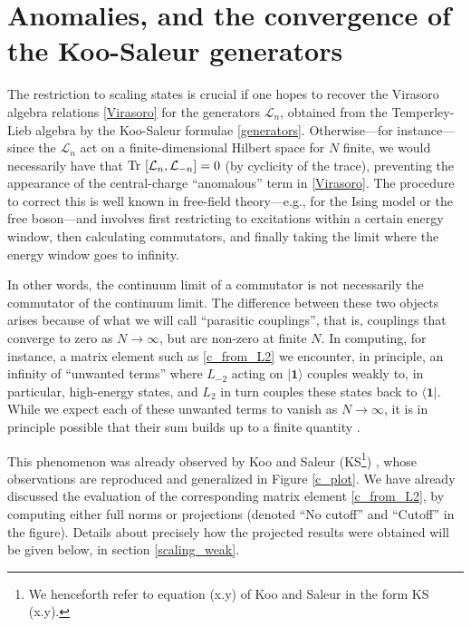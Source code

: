 \documentclass[a4paper,10pt]{article}
\begin{document}
\FloatBarrier


\section{Anomalies, and the convergence of the Koo-Saleur generators}\label{Anomalies}

The restriction to scaling states is crucial if one hopes to recover the Virasoro algebra relations \eqref{Virasoro} for the generators ${\mathcal L}_n$, obtained from the Temperley-Lieb algebra by the Koo-Saleur formulae \eqref{generators}. Otherwise---for instance---since the ${\mathcal L}_n$ act on a finite-dimensional Hilbert space for $N$ finite, we would necessarily have that  $\hbox{Tr }[{\mathcal L}_n,{\mathcal L}_{-n}]=0$ (by cyclicity of the trace), preventing the appearance of the central-charge ``anomalous'' term in \eqref{Virasoro}. The procedure to correct this is well known \cite{KacRaina} in free-field theory---e.g., for the Ising model or the free boson---and involves first  restricting to excitations within a certain energy window, then calculating commutators, and finally taking the limit where the energy window goes to infinity.

In other words,  the continuum limit of a commutator is not necessarily the commutator of the continuum limit.  The difference between these two objects arises because of what we will call ``parasitic couplings'', that is, couplings that converge to zero as $N\to\infty$, but are non-zero at finite $N$. In computing, for instance, a matrix element such as \eqref{c_from_L2} we encounter, in principle, an infinity of ``unwanted terms'' where $L_{-2}$ acting on $| \mathbf{1} \rangle$ couples weakly to, in particular, high-energy states, and $L_2$ in turn couples these states back to $\langle \mathbf{1} |$. While we expect each of these unwanted terms to vanish as $N\to \infty$, it is in principle possible that their sum builds up to a finite quantity \cite{Johnson, KacRaina}.

This phenomenon was already observed by Koo and Saleur (KS\footnote{We henceforth refer to equation (x.y) of Koo and Saleur \cite{KooSaleur} in the form KS (x.y).}) \cite{KooSaleur}, whose observations are reproduced and generalized in Figure \ref{c_plot}. We have already discussed the evaluation of the corresponding matrix element \eqref{c_from_L2}, by computing either full norms or projections (denoted ``No cutoff'' and ``Cutoff'' in the figure). Details about precisely how the projected results were obtained will be given below, in section \ref{scaling_weak}.
\end{document}
